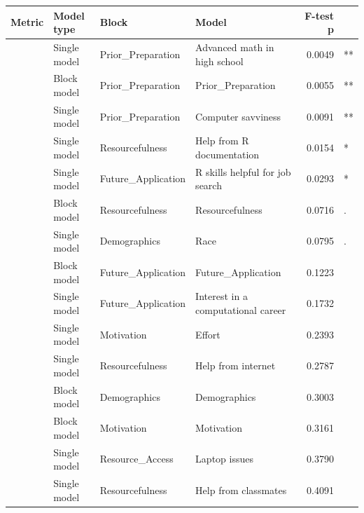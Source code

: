 \begin{table}[!h]
\centering
\begin{threeparttable}
\begin{tabular}[t]{>{}llllrl}
\toprule
\textbf{Metric} & \textbf{Model type} & \textbf{Block} & \textbf{Model} & \textbf{F-test p} & \textbf{}\\
\midrule
 & Single model & Prior_Preparation & Advanced math in high school & 0.0049 & **\\

 & Block model & Prior_Preparation & Prior_Preparation & 0.0055 & **\\

 & Single model & Prior_Preparation & Computer savviness & 0.0091 & **\\

 & Single model & Resourcefulness & Help from R documentation & 0.0154 & *\\

 & Single model & Future_Application & R skills helpful for job search & 0.0293 & *\\

 & Block model & Resourcefulness & Resourcefulness & 0.0716 & .\\

 & Single model & Demographics & Race & 0.0795 & .\\

 & Block model & Future_Application & Future_Application & 0.1223 & \\

 & Single model & Future_Application & Interest in a computational career & 0.1732 & \\

 & Single model & Motivation & Effort & 0.2393 & \\

 & Single model & Resourcefulness & Help from internet & 0.2787 & \\

 & Block model & Demographics & Demographics & 0.3003 & \\

 & Block model & Motivation & Motivation & 0.3161 & \\

 & Single model & Resource_Access & Laptop issues & 0.3790 & \\

 & Single model & Resourcefulness & Help from classmates & 0.4091 & \\


\end{tabular}
\end{threeparttable}
\end{table}

